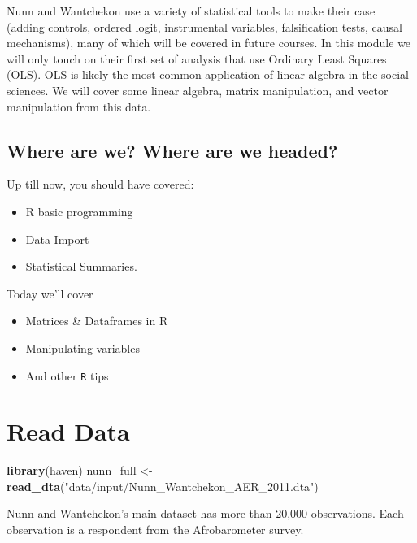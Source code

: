 \documentclass[
]{book}
\newenvironment{Shaded}{\begin{snugshade}}{\end{snugshade}}
\newcommand{\KeywordTok}[1]{\textcolor[rgb]{0.13,0.29,0.53}{\textbf{#1}}}
\newcommand{\NormalTok}[1]{#1}
\newcommand{\StringTok}[1]{\textcolor[rgb]{0.31,0.60,0.02}{#1}}
\providecommand{\tightlist}{%
  \setlength{\itemsep}{0pt}\setlength{\parskip}{0pt}}
\theoremstyle{definition}
\theoremstyle{definition}
\theoremstyle{definition}
\theoremstyle{remark}
\begin{document}
Nunn and Wantchekon use a variety of statistical tools to make their case (adding controls, ordered logit, instrumental variables, falsification tests, causal mechanisms), many of which will be covered in future courses. In this module we will only touch on their first set of analysis that use Ordinary Least Squares (OLS). OLS is likely the most common application of linear algebra in the social sciences. We will cover some linear algebra, matrix manipulation, and vector manipulation from this data.

\hypertarget{where-are-we-where-are-we-headed-1}{%
\subsection*{Where are we? Where are we headed?}\label{where-are-we-where-are-we-headed-1}}

Up till now, you should have covered:

\begin{itemize}
\tightlist
\item
  R basic programming
\item
  Data Import
\item
  Statistical Summaries.
\end{itemize}

Today we'll cover

\begin{itemize}
\tightlist
\item
  Matrices \& Dataframes in R
\item
  Manipulating variables
\item
  And other \texttt{R} tips
\end{itemize}

\hypertarget{read-data-1}{%
\section{Read Data}\label{read-data-1}}

\begin{Shaded}
\begin{Highlighting}[]
\KeywordTok{library}\NormalTok{(haven)}
\NormalTok{nunn\_full <{-}}\StringTok{ }\KeywordTok{read\_dta}\NormalTok{(}\StringTok{"data/input/Nunn\_Wantchekon\_AER\_2011.dta"}\NormalTok{)}
\end{Highlighting}
\end{Shaded}

Nunn and Wantchekon's main dataset has more than 20,000 observations. Each observation is a respondent from the Afrobarometer survey.
\end{document}
